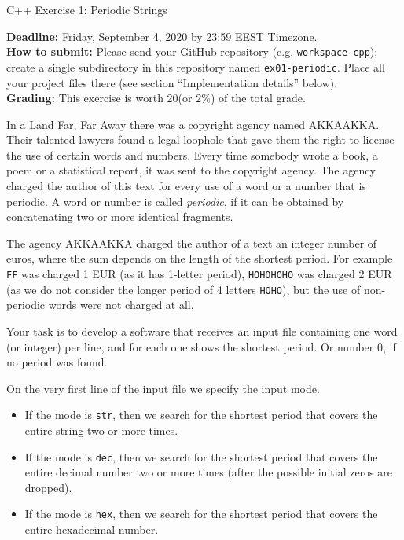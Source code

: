 \documentclass[11pt]{article}
\begin{document}
\thispagestyle{empty}



\begin{center}
{\Large C++ Exercise 1: Periodic Strings}
\end{center}

{\bf Deadline:} Friday, September 4, 2020 by 23:59 EEST Timezone.\\ 
{\bf How to submit:} Please send your GitHub repository (e.g. 
{\tt workspace-cpp}); create a single subdirectory in this 
repository named {\tt ex01-periodic}. Place all your project files there
(see section ``Implementation details'' below).\\
{\bf Grading:} This exercise is worth 20\textperthousand (or $2\%$) of the total grade.

\vspace{10pt}
{\small
In a Land Far, Far Away there was a copyright agency named AKKAAKKA. Their 
talented lawyers found a legal loophole that gave them the right to 
license the use of certain words and numbers. 
Every time somebody wrote a book, a poem or a statistical report, 
it was sent to the copyright agency. 
The agency charged the author of this text for every use of a word or a number that is periodic. 
A word or number is called {\em periodic}, if it can be obtained by concatenating 
two or more identical fragments. 

The agency AKKAAKKA charged the author of a text an integer number of euros, 
where the sum depends on the length of the shortest period. 
For example {\tt FF} was charged 1 EUR (as it has 1-letter period), 
{\tt HOHOHOHO} was charged 2 EUR (as we do not consider the longer period of 4 letters {\tt HOHO}), 
but the use of non-periodic words were not charged at all. 
}

\vspace{10pt}
Your task is to develop a software that receives an input file containing
one word (or integer) per line, and for each one shows the shortest period.
Or number $0$, if no period was found.

On the very first line of the input file we specify the input mode. 
\begin{itemize}
\item
If the mode is {\tt str}, then we search for the shortest period that covers the entire string two or more times.
\item 
If the mode is {\tt dec}, then we search for the shortest period that covers the entire decimal number 
two or more times (after the possible initial zeros are dropped).
\item 
If the mode is {\tt hex}, then we search for the shortest period that covers the entire hexadecimal number. 
\end{itemize}
\end{document}
